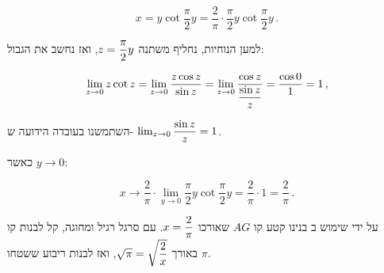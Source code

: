 \[
x = y\cot \frac{\pi}{2}y = \frac{2}{\pi}\cdot \frac{\pi}{2}y\cot \frac{\pi}{2}y\,.
\]

למען הנוחיות, נחליף משתנה
$z=\displaystyle\frac{\pi}{2}y$,
ואז נחשב את הגבול:

\[
\lim_{z\rightarrow 0} z\cot z = \lim_{z\rightarrow 0} \frac{z\cos z}{\sin z} = \lim_{z\rightarrow 0} \frac{\cos z}{\displaystyle\frac{\sin z}{z}} = \frac{\cos 0}{1} = 1\,,
\]

השתמשנו בעובדה הידועה ש-%
$\lim_{z\rightarrow 0} \displaystyle\frac{\sin z}{z}=1$.

כאשר
$y\rightarrow 0$:

\[
x \rightarrow \frac{2}{\pi}\cdot \lim_{y\rightarrow 0}\frac{\pi}{2}y\cot \frac{\pi}{2}y = \frac{2}{\pi}\cdot 1 = \frac{2}{\pi}\,.
\]

על ידי שימוש ב%
\qd{}
בנינו קטע קו
$AG$
שאורכו
$x=\displaystyle\frac{2}{\pi}$.
עם סרגל רגיל ומחוגה, קל לבנות קו באורך
$\sqrt{\pi}=\sqrt{\displaystyle\frac{2}{x}}$,
ואז לבנות ריבוע ששטחו
$\pi$.

